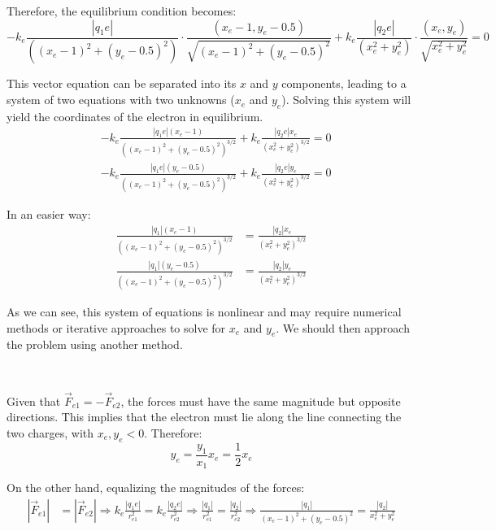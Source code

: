 \begin{ejercicio}
\begin{description}
        Therefore, the equilibrium condition becomes:
        \begin{equation*}
            -k_e \frac{|q_1 e|}{((x_e - 1)^2 + (y_e - 0.5)^2)} \cdot \frac{(x_e - 1, y_e - 0.5)}{\sqrt{(x_e - 1)^2 + (y_e - 0.5)^2}} + k_e \frac{|q_2 e|}{(x_e^2 + y_e^2)} \cdot \frac{(x_e, y_e)}{\sqrt{x_e^2 + y_e^2}} = 0
        \end{equation*}

        This vector equation can be separated into its $x$ and $y$ components, leading to a system of two equations with two unknowns ($x_e$ and $y_e$). Solving this system will yield the coordinates of the electron in equilibrium.
        \begin{align*}
            & -k_e \frac{|q_1 e| (x_e - 1)}{((x_e - 1)^2 + (y_e - 0.5)^2)^{3/2}} + k_e \frac{|q_2 e| x_e}{(x_e^2 + y_e^2)^{3/2}} = 0 \\
            & -k_e \frac{|q_1 e| (y_e - 0.5)}{((x_e - 1)^2 + (y_e - 0.5)^2)^{3/2}} + k_e \frac{|q_2 e| y_e}{(x_e^2 + y_e^2)^{3/2}} = 0
        \end{align*}

        In an easier way:
        \begin{align*}
            \frac{|q_1| (x_e - 1)}{((x_e - 1)^2 + (y_e - 0.5)^2)^{3/2}} &= \frac{|q_2| x_e}{(x_e^2 + y_e^2)^{3/2}}\\
            \frac{|q_1| (y_e - 0.5)}{((x_e - 1)^2 + (y_e - 0.5)^2)^{3/2}} &= \frac{|q_2| y_e}{(x_e^2 + y_e^2)^{3/2}}
        \end{align*}

        As we can see, this system of equations is nonlinear and may require numerical methods or iterative approaches to solve for $x_e$ and $y_e$. We should then approach the problem using another method.

        \item[Option 2]~
        
        Given that $\vec{F}_{e1}= -\vec{F}_{e2}$, the forces must have the same magnitude but opposite directions. This implies that the electron must lie along the line connecting the two charges, with $x_e, y_e <0$. Therefore:
        \begin{equation*}
            y_e = \frac{y_1}{x_1} x_e = \frac{1}{2} x_e
        \end{equation*}

        On the other hand, equalizing the magnitudes of the forces:
        \begin{align*}
            |\vec{F}_{e1}| &= |\vec{F}_{e2}| \Longrightarrow
            k_e \frac{|q_1 e|}{r_{e1}^2} = k_e \frac{|q_2 e|}{r_{e2}^2} \Longrightarrow
            \frac{|q_1|}{r_{e1}^2} = \frac{|q_2|}{r_{e2}^2}
            \Longrightarrow
            \frac{|q_1|}{(x_e - 1)^2 + (y_e - 0.5)^2} = \frac{|q_2|}{x_e^2 + y_e^2}
        \end{align*}


\end{description}
\end{ejercicio}
